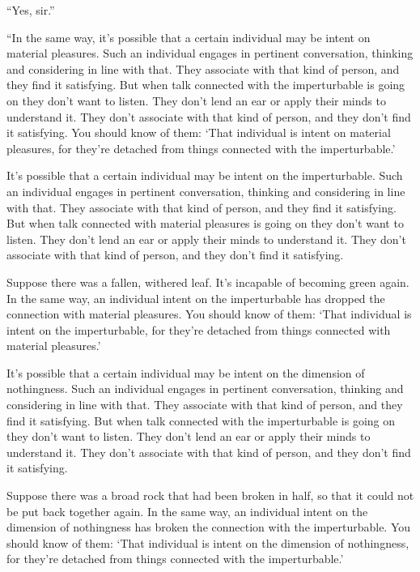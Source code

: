 \documentclass[12pt,openany]{book}%
\begin{document}
“Yes, sir.” 

“In the same way, it’s possible that a certain individual may be intent on material pleasures. Such an individual engages in pertinent conversation, thinking and considering in line with that. They associate with that kind of person, and they find it satisfying. But when talk connected with the imperturbable is going on they don’t want to listen. They don’t lend an ear or apply their minds to understand it. They don’t associate with that kind of person, and they don’t find it satisfying. You should know of them: ‘That individual is intent on material pleasures, for they’re detached from things connected with the imperturbable.’ 

It’s possible that a certain individual may be intent on the imperturbable. Such an individual engages in pertinent conversation, thinking and considering in line with that. They associate with that kind of person, and they find it satisfying. But when talk connected with material pleasures is going on they don’t want to listen. They don’t lend an ear or apply their minds to understand it. They don’t associate with that kind of person, and they don’t find it satisfying. 

Suppose there was a fallen, withered leaf. It’s incapable of becoming green again. In the same way, an individual intent on the imperturbable has dropped the connection with material pleasures. You should know of them: ‘That individual is intent on the imperturbable, for they’re detached from things connected with material pleasures.’ 

It’s possible that a certain individual may be intent on the dimension of nothingness. Such an individual engages in pertinent conversation, thinking and considering in line with that. They associate with that kind of person, and they find it satisfying. But when talk connected with the imperturbable is going on they don’t want to listen. They don’t lend an ear or apply their minds to understand it. They don’t associate with that kind of person, and they don’t find it satisfying. 

Suppose there was a broad rock that had been broken in half, so that it could not be put back together again. In the same way, an individual intent on the dimension of nothingness has broken the connection with the imperturbable. You should know of them: ‘That individual is intent on the dimension of nothingness, for they’re detached from things connected with the imperturbable.’ 
\end{document}
